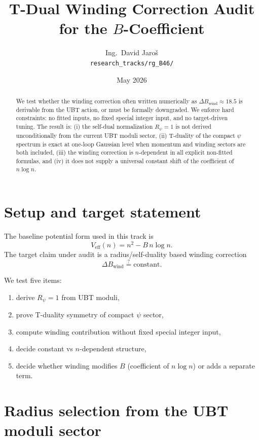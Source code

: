 \documentclass[11pt,a4paper]{article}
\title{T-Dual Winding Correction Audit for the $B$-Coefficient}
\author{Ing.\ David Jaro\v{s}\\
\small \texttt{research\_tracks/rg\_B46/}}
\date{May 2026}
\begin{document}
\maketitle

\begin{abstract}
We test whether the winding correction often written numerically as
$\Delta B_{\mathrm{wind}}\approx 18.5$ is derivable from the UBT action, or must be
formally downgraded. We enforce hard constraints: no fitted inputs, no fixed
special integer input, and no target-driven tuning. The result is: (i) the
self-dual normalization $R_{\psi}=1$ is not derived unconditionally from the
current UBT moduli sector, (ii) T-duality of the compact $\psi$ spectrum is
exact at one-loop Gaussian level when momentum and winding sectors are both
included, (iii) the winding correction is $n$-dependent in all explicit
non-fitted formulas, and (iv) it does not supply a universal constant shift of
the coefficient of $n\log n$.
\end{abstract}

\tableofcontents

\section{Setup and target statement}

The baseline potential form used in this track is
\begin{equation}
V_{\mathrm{eff}}(n)=n^2-B\,n\log n.
\end{equation}
The target claim under audit is a radius/self-duality based winding correction
\begin{equation}
\Delta B_{\mathrm{wind}}\stackrel{?}{=}\text{constant}.
\end{equation}

We test five items:
\begin{enumerate}
\item derive $R_{\psi}=1$ from UBT moduli,
\item prove T-duality symmetry of compact $\psi$ sector,
\item compute winding contribution without fixed special integer input,
\item decide constant vs $n$-dependent structure,
\item decide whether winding modifies $B$ (coefficient of $n\log n$) or adds a separate term.
\end{enumerate}

\section{Radius selection from the UBT moduli sector}
\end{document}
